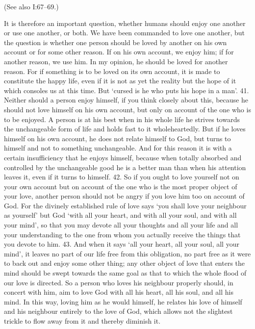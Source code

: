 			(See also I:67--69.)
		
			It is therefore an important question, whether humans should enjoy one another or use one another, or both. We have been commanded to love one another, but the question is whether one person should be loved by another on his own account or for some other reason. If on his own account, we enjoy him; if for another reason, we use him. In my opinion, he should be loved for another reason. For if something is to be loved on its own account, it is made to constitute the happy life, even if it is not as yet the reality but the hope of it which consoles us at this time. But `cursed is he who puts his hope in a man'. 41. Neither should a person enjoy himself, if you think closely about this, because he should not love himself on his own account, but only on account of the one who is to be enjoyed. A person is at his best when in his whole life he strives towards the unchangeable form of life and holds fast to it wholeheartedly. But if he loves himself on his own account, he does not relate himself to God, but turns to himself and not to something unchangeable. And for this reason it is with a certain insufficiency that he enjoys himself, because when totally absorbed and controlled by the unchangeable good he is a better man than when his attention leaves it, even if it turns to himself. 42. So if you ought to love yourself not on your own account but on account of the one who is the most proper object of your love, another person should not be angry if you love him too on account of God. For the divinely established rule of love says `you shall love your neighbour as yourself' but God `with all your heart, and with all your soul, and with all your mind', so that you may devote all your thoughts and all your life and all your understanding to the one from whom you actually receive the things that you devote to him. 43. And when it says `all your heart, all your soul, all your mind', it leaves no part of our life free from this obligation, no part free as it were to back out and enjoy some other thing; any other object of love that enters the mind should be swept towards the same goal as that to which the whole flood of our love is directed. So a person who loves his neighbour properly should, in concert with him, aim to love God with all his heart, all his soul, and all his mind. In this way, loving him as he would himself, he relates his love of himself and his neighbour entirely to the love of God, which allows not the slightest trickle to flow away from it and thereby diminish it. 